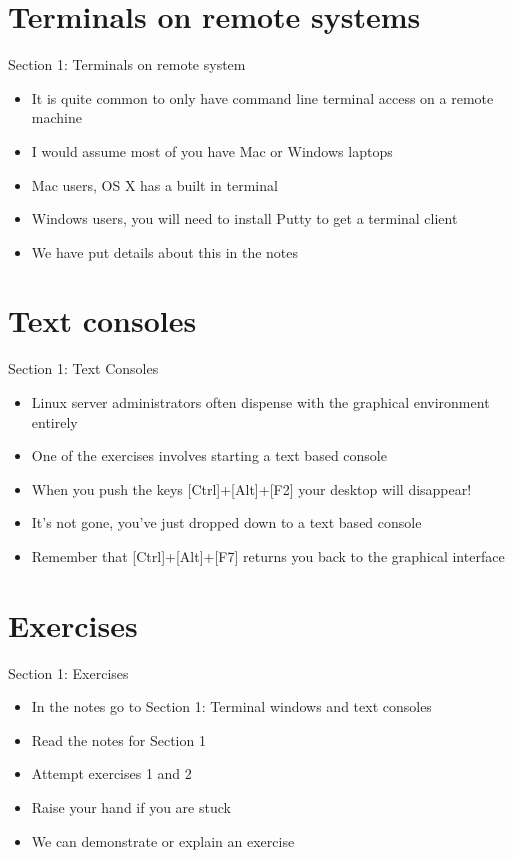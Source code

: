 \section{Terminals on remote systems}
\begin{frame}{Section 1: Terminals on remote system}
\begin{itemize}
\item It is quite common to only have command line terminal access on a remote machine
\item I would assume most of you have Mac or Windows laptops
\item Mac users, OS X has a built in terminal
\item Windows users, you will need to install Putty to get a terminal client
\item We have put details about this in the notes
\end{itemize}
\end{frame}

\section{Text consoles}
\begin{frame}{Section 1: Text Consoles}
\begin{itemize}
\item Linux server administrators often dispense with the graphical environment entirely
\item One of the exercises involves starting a text based console
\item When you push the keys [Ctrl]+[Alt]+[F2] your desktop will disappear!
\item It's not gone, you've just dropped down to a text based console
\item Remember that [Ctrl]+[Alt]+[F7] returns you back to the graphical interface
\end{itemize}
\end{frame}

\section{Exercises}
\begin{frame}{Section 1: Exercises}
\begin{itemize}
\item In the notes go to Section 1: Terminal windows and text consoles
\item Read the notes for Section 1 
\item Attempt exercises 1 and 2
\item Raise your hand if you are stuck
\item We can demonstrate or explain an exercise
\end{itemize}
\end{frame}
